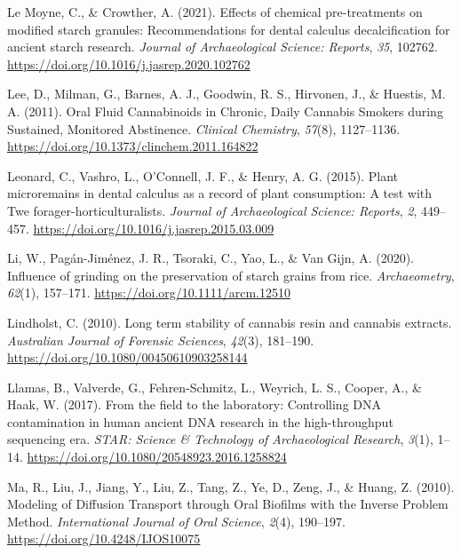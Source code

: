 \documentclass[
  b5paper,
]{book}
\newlength{\cslhangindent}
\newlength{\cslentryspacingunit} %
\newenvironment{CSLReferences}[2] %
 {%
  \setlength{\parindent}{0pt}
  \ifodd #1
  \let\oldpar\par
  \def\par{\hangindent=\cslhangindent\oldpar}
  \fi
  \setlength{\parskip}{#2\cslentryspacingunit}
 }%
 {}
\begin{document}
\begin{CSLReferences}{1}{0}
\leavevmode{}%
Le Moyne, C., \& Crowther, A. (2021). Effects of chemical pre-treatments
on modified starch granules: {Recommendations} for dental calculus
decalcification for ancient starch research. \emph{Journal of
Archaeological Science: Reports}, \emph{35}, 102762.
\url{https://doi.org/10.1016/j.jasrep.2020.102762}

\leavevmode{}%
Lee, D., Milman, G., Barnes, A. J., Goodwin, R. S., Hirvonen, J., \&
Huestis, M. A. (2011). Oral {Fluid Cannabinoids} in {Chronic}, {Daily
Cannabis Smokers} during {Sustained}, {Monitored Abstinence}.
\emph{Clinical Chemistry}, \emph{57}(8), 1127--1136.
\url{https://doi.org/10.1373/clinchem.2011.164822}

\leavevmode{}%
Leonard, C., Vashro, L., O'Connell, J. F., \& Henry, A. G. (2015). Plant
microremains in dental calculus as a record of plant consumption: {A}
test with {Twe} forager-horticulturalists. \emph{Journal of
Archaeological Science: Reports}, \emph{2}, 449--457.
\url{https://doi.org/10.1016/j.jasrep.2015.03.009}

\leavevmode{}%
Li, W., Pagán-Jiménez, J. R., Tsoraki, C., Yao, L., \& Van Gijn, A.
(2020). Influence of grinding on the preservation of starch grains from
rice. \emph{Archaeometry}, \emph{62}(1), 157--171.
\url{https://doi.org/10.1111/arcm.12510}

\leavevmode{}%
Lindholst, C. (2010). Long term stability of cannabis resin and cannabis
extracts. \emph{Australian Journal of Forensic Sciences}, \emph{42}(3),
181--190. \url{https://doi.org/10.1080/00450610903258144}

\leavevmode{}%
Llamas, B., Valverde, G., Fehren-Schmitz, L., Weyrich, L. S., Cooper,
A., \& Haak, W. (2017). From the field to the laboratory: {Controlling
DNA} contamination in human ancient {DNA} research in the
high-throughput sequencing era. \emph{STAR: Science \& Technology of
Archaeological Research}, \emph{3}(1), 1--14.
\url{https://doi.org/10.1080/20548923.2016.1258824}

\leavevmode{}%
Ma, R., Liu, J., Jiang, Y., Liu, Z., Tang, Z., Ye, D., Zeng, J., \&
Huang, Z. (2010). Modeling of {Diffusion Transport} through {Oral
Biofilms} with the {Inverse Problem Method}. \emph{International Journal
of Oral Science}, \emph{2}(4), 190--197.
\url{https://doi.org/10.4248/IJOS10075}


\end{CSLReferences}
\end{document}
